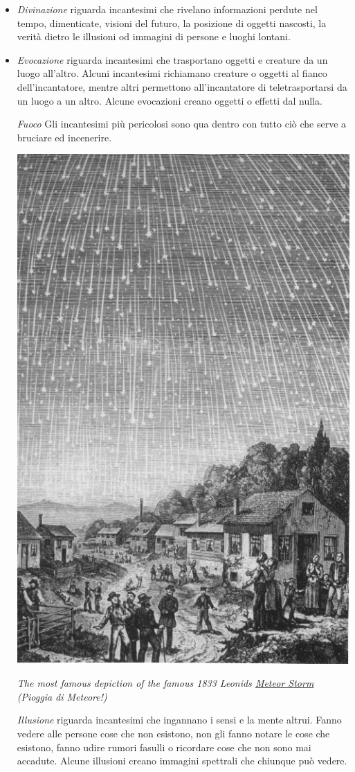 \begin{multicols}{2}
\begin{itemize}[leftmargin=*]
\item
\emph{Divinazione} riguarda incantesimi che rivelano informazioni perdute nel tempo, dimenticate, visioni del futuro, la posizione di oggetti nascosti, la verità dietro le illusioni od immagini di persone e luoghi lontani.

\item
\emph{Evocazione} riguarda incantesimi che trasportano oggetti e creature da un luogo all'altro. Alcuni incantesimi richiamano creature o oggetti al fianco dell'incantatore, mentre altri permettono all'incantatore di teletrasportarsi da un luogo a un altro. Alcune evocazioni creano oggetti o effetti dal nulla.

\emph{Fuoco} Gli incantesimi più pericolosi sono qua dentro con tutto ciò che serve a bruciare ed incenerire.

\begin{center}
	\includegraphics[width=0.6\linewidth]{immagini/Leonids-1833.png}

	\emph{The most famous depiction of the famous 1833 Leonids \hyperlink{sciamedimeteore}{Meteor Storm} (Pioggia di Meteore!)}
\end{center}

\emph{Illusione} riguarda incantesimi che ingannano i sensi e la mente altrui. Fanno vedere alle persone cose che non esistono, non gli fanno notare le cose che esistono, fanno udire rumori fasulli o ricordare cose che non sono mai accadute. Alcune illusioni creano immagini spettrali che chiunque può vedere.


\end{itemize}
\end{multicols}
